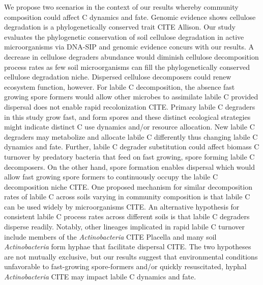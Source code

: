 We propose two scenarios in the context of our results whereby community
composition could affect C dynamics and fate. Genomic evidence shows
cellulose degradation is a phylogenetically conserved trait CITE Allison.
Our study evaluates the phylogenetic conservation of soil cellulose
degradation in active microorganisms via DNA-SIP and genomic evidence
concurs with our results. A decrease in cellulose degraders abundance
would diminish cellulose decomposition process rates as few soil
microorganisms can fill the phylogenetically conserved cellulose
degradation niche. Dispersed cellulose decomposers could renew ecosystem
function, however. For labile C decomposition, the
absence fast growing spore formers would allow other microbes to
assimilate labile C provided dispersal does not enable rapid
recolonization CITE. Primary labile C degraders in this study grow fast,
and form spores and these distinct ecological strategies might indicate
distinct C use dynamics and/or resource allocation. New labile C degraders
may metabolize and allocate labile C differently thus changing labile
C dynamics and fate. Further, labile C degrader substitution could affect
biomass C turnover by predatory bacteria that feed on fast growing, spore
forming labile C decomposers. On the other hand, spore formation enables
dispersal which would allow fast growing spore formers to continuously
occupy the labile C decomposition niche CITE. One proposed mechanism for
similar decomposition rates of labile C across soils varying in community
composition is that labile C can be used widely by microorganisms CITE. An
alternative hypothesis for consistent labile C process rates across
different soils is that labile C degraders disperse readily. Notably,
other lineages implicated in rapid labile C turnover include members of
the \textit{Actinobacteria} CITE Placella and many soil
\textit{Actinobacteria} form hyphae that facilitate dispersal CITE. The
two hypotheses are not mutually exclusive, but our results suggest that
environmental conditions unfavorable to fast-growing spore-formers and/or
quickly resuscitated, hyphal \textit{Actinobacteria} CITE may impact
labile C dynamics and fate.

